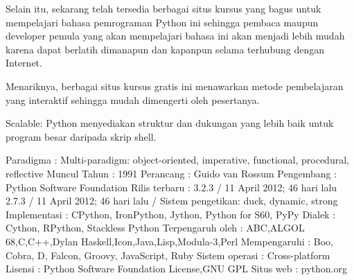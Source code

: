 \noindent 
{\fontsize{14pt}{14pt}\selectfont Selain itu, sekarang telah tersedia berbagai situs kursus yang bagus untuk mempelajari bahasa pemrograman Python ini sehingga pembaca maupun developer pemula yang akan mempelajari bahasa ini akan menjadi lebih mudah karena dapat berlatih dimanapun dan kapanpun selama terhubung dengan Internet. \\} \par
\noindent 
{\fontsize{14pt}{14pt}\selectfont Menariknya, berbagai situs kursus gratis ini menawarkan metode pembelajaran yang interaktif sehingga mudah dimengerti oleh pesertanya. \\} \par
\vspace{14pt}
\noindent 
{\fontsize{14pt}{14pt}\selectfont Scalable: Python menyediakan struktur dan dukungan yang lebih baik untuk program besar daripada skrip shell. \\} \par
\vspace{14pt}
\noindent 
{\fontsize{14pt}{14pt}\selectfont Paradigma : Multi-paradigm: object-oriented, imperative, functional, procedural, reflective\vspace{\baselineskip}
Muncul Tahun : 1991\vspace{\baselineskip}
Perancang : Guido van Rossum\vspace{\baselineskip}
Pengembang : Python Software Foundation\vspace{\baselineskip}
Rilis terbaru : 3.2.3 / 11 April 2012; 46 hari lalu 2.7.3 / 11 April 2012; 46 hari lalu /\vspace{\baselineskip}
Sistem pengetikan: duck, dynamic, strong\vspace{\baselineskip}
Implementasi : CPython, IronPython, Jython, Python for S60, PyPy\vspace{\baselineskip}
Dialek : Cython, RPython, Stackless Python\vspace{\baselineskip}
Terpengaruh oleh : ABC,ALGOL 68,C,C++,Dylan Haskell,Icon,Java,Lisp,Modula-3,Perl\vspace{\baselineskip}
Mempengaruhi : Boo, Cobra, D, Falcon, Groovy, JavaScript, Ruby\vspace{\baselineskip}
Sistem operasi : Cross-platform\vspace{\baselineskip}
Lisensi : Python Software Foundation License,GNU GPL\vspace{\baselineskip}
Situs web : python.org \\} \par
\noindent 
